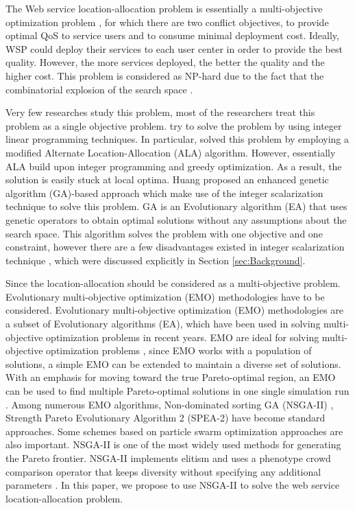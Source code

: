 \documentclass{llncs}
\begin{document}
The Web service location-allocation problem is essentially a multi-objective optimization problem \cite{Multiobjective}, for which there are two conflict objectives, to provide optimal 
QoS to service users and to consume minimal deployment cost.
Ideally, WSP could deploy their services to each user center in order to provide the best quality.
However, the more services deployed, the better the quality and the higher cost. 
This problem is considered as NP-hard due to the fact that the combinatorial explosion of the search space \cite{Vanrompay}. 


Very few researches study this problem, most of the researchers treat this problem as a single objective problem.
\cite{Aboolian} \cite{Sun} try to solve the problem by using integer linear programming techniques.
In particular, \cite{Sun} solved this problem by employing a modified Alternate Location-Allocation (ALA) algorithm. 
However, essentially ALA build upon integer programming and greedy optimization. 
As a result, the solution is easily stuck at local optima.
Huang \cite{EnhancedGenetic} proposed an enhanced genetic algorithm (GA)-based approach which make use of the integer scalarization technique to solve this problem.
GA \cite{man1996genetic} is an Evolutionary algorithm (EA) that uses genetic operators to obtain optimal solutions without any assumptions about the search space.
This algorithm solves the problem with one objective and one constraint, however there are a few disadvantages existed in
integer scalarization technique \cite{Multiobjective}, which were discussed explicitly in Section \ref{sec:Background}.

Since the location-allocation should be considered as a multi-objective problem. Evolutionary multi-objective optimization (EMO) methodologies have to be considered.
Evolutionary multi-objective optimization (EMO) methodologies are a subset of Evolutionary algorithms (EA), which have been used in solving multi-objective optimization problems in recent years. 
EMO are ideal for solving multi-objective optimization problems \cite{key:article}, since EMO works with a population of solutions, 
a simple EMO can be extended to maintain a diverse set of solutions.
With an emphasis for moving toward the true Pareto-optimal region, an EMO can be used to find multiple Pareto-optimal solutions in 
one single simulation run \cite{OptimizationElectrical}. Among numerous EMO algorithms,
Non-dominated sorting GA (NSGA-II) \cite{996017}, Strength Pareto Evolutionary Algorithm 2 (SPEA-2) \cite{Deb} have become standard approaches. 
Some schemes based on particle swarm optimization approaches \cite{Elhossini} \cite{Huang} are also important. 
NSGA-II is one of the most widely used methods for generating the Pareto frontier. 
NSGA-II implements elitism and uses a phenotype crowd comparison operator that keeps diversity without specifying any additional parameters \cite{Deb06referencepoint}.
In this paper, we propose to use NSGA-II to solve the web service location-allocation problem.
\end{document}
